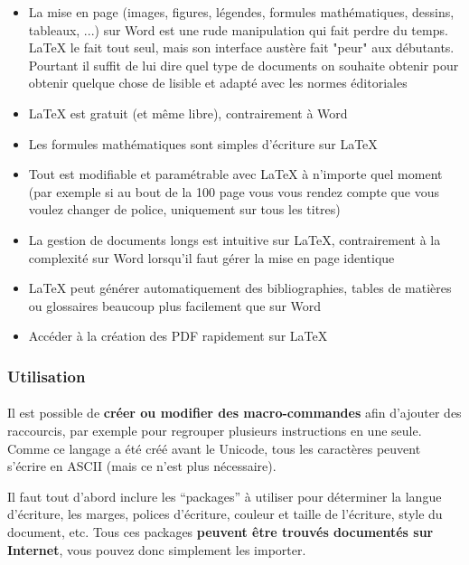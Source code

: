 \begin{itemize}
	\item La mise en page (images, figures, légendes, formules mathématiques,
		dessins, tableaux, ...) sur Word est une rude manipulation qui fait
		perdre du temps. \LaTeX{} le fait tout seul, mais son interface austère
		fait "peur" aux débutants. Pourtant il suffit de lui dire quel type de
		documents on souhaite obtenir pour obtenir quelque chose de lisible et
		adapté avec les normes éditoriales
	\item \LaTeX{} est gratuit (et même libre), contrairement à Word
	\item Les formules mathématiques sont simples d'écriture sur \LaTeX
	\item Tout est modifiable et paramétrable avec \LaTeX{} à n'importe quel
		moment (par exemple si au bout de la 100\ieme{} page vous vous rendez
		compte que vous voulez changer de police, uniquement sur tous les
		titres)
	\item La gestion de documents longs est intuitive sur \LaTeX ,
		contrairement à la complexité sur Word lorsqu'il faut gérer la mise en
		page identique
	\item \LaTeX{} peut générer automatiquement des bibliographies, tables de
		matières ou glossaires beaucoup plus facilement que sur Word
	\item Accéder à la création des PDF rapidement sur \LaTeX
\end{itemize}

\subsubsection*{Utilisation}

\paragraph{} Il est possible de \textbf{créer ou modifier des macro-commandes}
afin d'ajouter des raccourcis, par exemple pour regrouper plusieurs
instructions en une seule. Comme ce langage a été créé avant le Unicode, tous
les caractères peuvent s'écrire en ASCII (mais ce n'est plus nécessaire).

Il faut tout d'abord inclure les ``packages'' à utiliser pour déterminer la
langue d’écriture, les marges, polices d’écriture, couleur et taille de
l’écriture, style du document, etc. Tous ces packages \textbf{peuvent être
trouvés documentés sur Internet}, vous pouvez donc simplement les importer.

